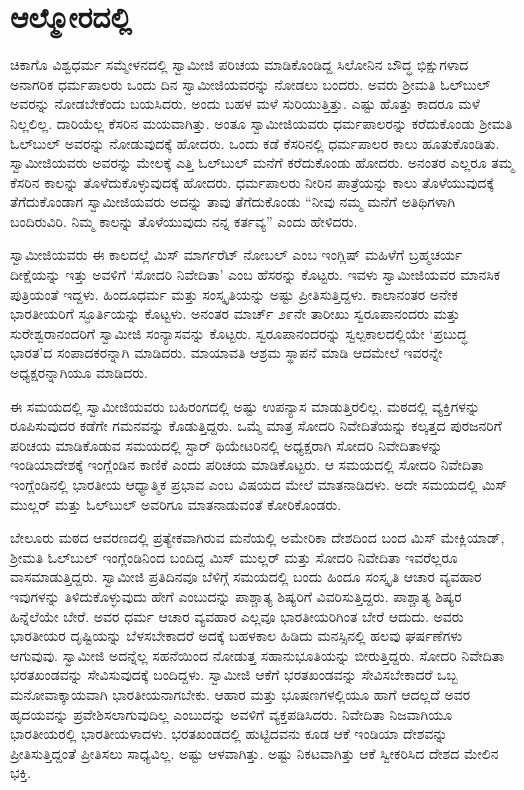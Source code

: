
\chapter{ಆಲ್ಮೋರದಲ್ಲಿ}

 ಚಿಕಾಗೊ ವಿಶ್ವಧರ್ಮ ಸಮ್ಮೇಳನದಲ್ಲಿ ಸ್ವಾಮೀಜಿ ಪರಿಚಯ ಮಾಡಿಕೊಂಡಿದ್ದ ಸಿಲೋನಿನ ಬೌದ್ಧ ಭಿಕ್ಷುಗಳಾದ ಅನಾಗರಿಕ ಧರ್ಮಪಾಲರು ಒಂದು ದಿನ ಸ್ವಾಮೀಜಿಯವರನ್ನು ನೋಡಲು ಬಂದರು. ಅವರು ಶ‍್ರೀಮತಿ ಓಲ್‍ಬುಲ್ ಅವರನ್ನು ನೋಡಬೇಕೆಂದು ಬಯಸಿದರು. ಅಂದು ಬಹಳ ಮಳೆ ಸುರಿಯುತ್ತಿತ್ತು. ಎಷ್ಟು ಹೊತ್ತು ಕಾದರೂ ಮಳೆ ನಿಲ್ಲಲಿಲ್ಲ. ದಾರಿಯೆಲ್ಲ ಕೆಸರಿನ ಮಯವಾಗಿತ್ತು. ಅಂತೂ ಸ್ವಾಮೀಜಿಯವರು ಧರ್ಮಪಾಲರನ್ನು ಕರೆದುಕೊಂಡು ಶ‍್ರೀಮತಿ ಓಲ್‍ಬುಲ್ ಅವರನ್ನು ನೋಡುವುದಕ್ಕೆ ಹೋದರು. ಒಂದು ಕಡೆ ಕೆಸರಿನಲ್ಲಿ ಧರ್ಮಪಾಲರ ಕಾಲು ಹೂತುಕೊಂಡಿತು. ಸ್ವಾಮೀಜಿಯವರು ಅವರನ್ನು ಮೇಲಕ್ಕೆ ಎತ್ತಿ ಓಲ್‍ಬುಲ್ ಮನೆಗೆ ಕರೆದುಕೊಂಡು ಹೋದರು. ಅನಂತರ ಎಲ್ಲರೂ ತಮ್ಮ ಕೆಸರಿನ ಕಾಲನ್ನು ತೊಳೆದುಕೊಳ್ಳುವುದಕ್ಕೆ ಹೋದರು. ಧರ್ಮಪಾಲರು ನೀರಿನ ಪಾತ್ರೆಯನ್ನು ಕಾಲು ತೊಳೆಯುವುದಕ್ಕೆ ತೆಗೆದುಕೊಂಡಾಗ ಸ್ವಾಮೀಜಿಯವರು ಅದನ್ನು ತಾವು ತೆಗೆದುಕೊಂಡು “ನೀವು ನಮ್ಮ ಮನೆಗೆ ಅತಿಥಿಗಳಾಗಿ ಬಂದಿರುವಿರಿ. ನಿಮ್ಮ ಕಾಲನ್ನು ತೊಳೆಯುವುದು ನನ್ನ ಕರ್ತವ್ಯ” ಎಂದು ಹೇಳಿದರು. 

 ಸ್ವಾಮೀಜಿಯವರು ಈ ಕಾಲದಲ್ಲೆ ಮಿಸ್ ಮಾರ್ಗರೆಟ್ ನೋಬಲ್ ಎಂಬ ಇಂಗ್ಲಿಷ್ ಮಹಿಳೆಗೆ ಬ್ರಹ್ಮಚರ್ಯ ದೀಕ್ಷೆಯನ್ನು ಇತ್ತು ಅವಳಿಗೆ ‘ಸೋದರಿ ನಿವೇದಿತಾ’ ಎಂಬ ಹೆಸರನ್ನು ಕೊಟ್ಟರು. ಇವಳು ಸ್ವಾಮೀಜಿಯವರ ಮಾನಸಿಕ ಪುತ್ರಿಯಂತೆ ಇದ್ದಳು. ಹಿಂದೂಧರ್ಮ ಮತ್ತು ಸಂಸ್ಕೃತಿಯನ್ನು ಅಷ್ಟು ಪ್ರೀತಿಸುತ್ತಿದ್ದಳು. ಕಾಲಾನಂತರ ಅನೇಕ ಭಾರತೀಯರಿಗೆ ಸ್ಫೂರ್ತಿಯನ್ನು ಕೊಟ್ಟಳು. ಅನಂತರ ಮಾರ್ಚ್ ೨೯ನೇ ತಾರೀಖು ಸ್ವರೂಪಾನಂದರು ಮತ್ತು ಸುರೇಶ್ವರಾನಂದರಿಗೆ ಸ್ವಾಮೀಜಿ ಸಂನ್ಯಾಸವನ್ನು ಕೊಟ್ಟರು. ಸ್ವರೂಪಾನಂದರನ್ನು ಸ್ವಲ್ಪಕಾಲದಲ್ಲಿಯೇ ‘ಪ್ರಬುದ್ಧ ಭಾರತ’ದ ಸಂಪಾದಕರನ್ನಾಗಿ ಮಾಡಿದರು. ಮಾಯಾವತಿ ಆಶ್ರಮ ಸ್ಥಾಪನೆ ಮಾಡಿ ಆದಮೇಲೆ ಇವರನ್ನೇ ಅಧ್ಯಕ್ಷರನ್ನಾಗಿಯೂ ಮಾಡಿದರು. 

 ಈ ಸಮಯದಲ್ಲಿ ಸ್ವಾಮೀಜಿಯವರು ಬಹಿರಂಗದಲ್ಲಿ ಅಷ್ಟು ಉಪನ್ಯಾಸ ಮಾಡುತ್ತಿರಲಿಲ್ಲ. ಮಠದಲ್ಲಿ ವ್ಯಕ್ತಿಗಳನ್ನು ರೂಪಿಸುವುದರ ಕಡೆಗೇ ಗಮನವನ್ನು ಕೊಡುತ್ತಿದ್ದರು. ಒಮ್ಮೆ ಮಾತ್ರ ಸೋದರಿ ನಿವೇದಿತೆಯನ್ನು ಕಲ್ಕತ್ತದ ಪುರಜನರಿಗೆ ಪರಿಚಯ ಮಾಡಿಕೊಡುವ ಸಮಯದಲ್ಲಿ ಸ್ಟಾರ್ ಥಿಯೇಟರಿನಲ್ಲಿ ಅಧ್ಯಕ್ಷರಾಗಿ ಸೋದರಿ ನಿವೇದಿತಾಳನ್ನು ಇಂಡಿಯಾದೇಶಕ್ಕೆ ಇಂಗ್ಲೆಂಡಿನ ಕಾಣಿಕೆ ಎಂದು ಪರಿಚಯ ಮಾಡಿಕೊಟ್ಟರು. ಆ ಸಮಯದಲ್ಲಿ ಸೋದರಿ ನಿವೇದಿತಾ ಇಂಗ್ಲೆಂಡಿನಲ್ಲಿ ಭಾರತೀಯ ಆಧ್ಯಾತ್ಮಿಕ ಪ್ರಭಾವ ಎಂಬ ವಿಷಯದ ಮೇಲೆ ಮಾತನಾಡಿದಳು. ಅದೇ ಸಮಯದಲ್ಲಿ ಮಿಸ್ ಮುಲ್ಲರ್ ಮತ್ತು ಓಲ್‍ಬುಲ್ ಅವರಿಗೂ ಮಾತನಾಡುವಂತೆ ಕೋರಿಕೊಂಡರು. 

 ಬೇಲೂರು ಮಠದ ಆವರಣದಲ್ಲಿ ಪ್ರತ್ಯೇಕವಾಗಿರುವ ಮನೆಯಲ್ಲಿ ಅಮೇರಿಕಾ ದೇಶದಿಂದ ಬಂದ ಮಿಸ್ ಮೇಕ್ಲಿಯಾಡ್, ಶ‍್ರೀಮತಿ ಓಲ್‍ಬುಲ್ ಇಂಗ್ಲೆಂಡಿನಿಂದ ಬಂದಿದ್ದ ಮಿಸ್ ಮುಲ್ಲರ್ ಮತ್ತು ಸೋದರಿ ನಿವೇದಿತಾ ಇವರೆಲ್ಲರೂ ವಾಸಮಾಡುತ್ತಿದ್ದರು. ಸ್ವಾಮೀಜಿ ಪ್ರತಿದಿನವೂ ಬೆಳಿಗ್ಗೆ ಸಮಯದಲ್ಲಿ ಬಂದು ಹಿಂದೂ ಸಂಸ್ಕೃತಿ ಆಚಾರ ವ್ಯವಹಾರ ಇವುಗಳನ್ನು ತಿಳಿದುಕೊಳ್ಳುವುದು ಹೇಗೆ ಎಂಬುದನ್ನು ಪಾಶ್ಚಾತ್ಯ ಶಿಷ್ಯರಿಗೆ ವಿವರಿಸುತ್ತಿದ್ದರು. ಪಾಶ್ಚಾತ್ಯ ಶಿಷ್ಯರ ಹಿನ್ನೆಲೆಯೇ ಬೇರೆ. ಅವರ ಧರ್ಮ ಆಚಾರ ವ್ಯವಹಾರ ಎಲ್ಲವೂ ಭಾರತೀಯರಿಗಿಂತ ಬೇರೆ ಆದುದು. ಅವರು ಭಾರತೀಯರ ದೃಷ್ಟಿಯನ್ನು ಬೆಳಸಬೇಕಾದರೆ ಅದಕ್ಕೆ ಬಹಳಕಾಲ ಹಿಡಿದು ಮನಸ್ಸಿನಲ್ಲಿ ಹಲವು ಘರ್ಷಣೆಗಳು ಆಗುವುವು. ಸ್ವಾಮೀಜಿ ಅದನ್ನೆಲ್ಲ ಸಹನೆಯಿಂದ ನೋಡುತ್ತ ಸಹಾನುಭೂತಿಯನ್ನು ಬೀರುತ್ತಿದ್ದರು. ಸೋದರಿ ನಿವೇದಿತಾ ಭರತಖಂಡವನ್ನು ಸೇವಿಸುವುದಕ್ಕೆ ಬಂದಿದ್ದಳು. ಸ್ವಾಮೀಜಿ ಆಕೆಗೆ ಭರತಖಂಡವನ್ನು ಸೇವಿಸಬೇಕಾದರೆ ಒಬ್ಬ ಮನೋವಾಕ್ಕಾಯವಾಗಿ ಭಾರತೀಯನಾಗಬೇಕು. ಆಹಾರ ಮತ್ತು ಭೂಷಣಗಳಲ್ಲಿಯೂ ಹಾಗೆ ಆದಲ್ಲದೆ ಅವರ ಹೃದಯವನ್ನು ಪ್ರವೇಶಿಸಲಾಗುವುದಿಲ್ಲ ಎಂಬುದನ್ನು ಅವಳಿಗೆ ವ್ಯಕ್ತಪಡಿಸಿದರು. ನಿವೇದಿತಾ ನಿಜವಾಗಿಯೂ ಭಾರತೀಯರಲ್ಲಿ ಭಾರತೀಯಳಾದಳು. ಭರತಖಂಡದಲ್ಲಿ ಹುಟ್ಟಿದವನು ಕೂಡ ಆಕೆ ಇಂಡಿಯಾ ದೇಶವನ್ನು ಪ್ರೀತಿಸುತ್ತಿದ್ದಂತೆ ಪ್ರೀತಿಸಲು ಸಾಧ್ಯವಿಲ್ಲ. ಅಷ್ಟು ಆಳವಾಗಿತ್ತು. ಅಷ್ಟು ನಿಕಟವಾಗಿತ್ತು ಆಕೆ ಸ್ವೀಕರಿಸಿದ ದೇಶದ ಮೇಲಿನ ಭಕ್ತಿ. 

